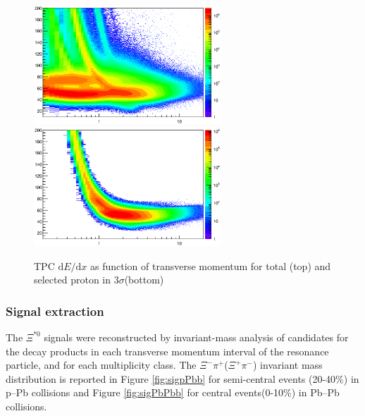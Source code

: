 \begin{figure}[htbp]
\begin{center}
\includegraphics[width=7.0cm]{./Version1/FigChapter5/Selection/PbPbTPCp.eps}
\hspace{0.5cm}
\includegraphics[width=7.0cm]{./Version1/FigChapter5/Selection/PbPbTPCpAfter.eps}
\label{fig:PbPb:TPCp} 
\caption{ TPC $\mathrm{d}E/\mathrm{d}x$ as function of transverse momentum for total (top) and selected proton in 3$\sigma$(bottom) }
\end{center}
\end{figure}



 
\newpage
\subsubsection{Signal extraction}\label{sec:pPb:signal}

The $\Xi^{*0}$ signals were reconstructed by invariant-mass analysis 
of candidates for the decay products in each transverse momentum interval of the resonance 
particle, and for each multiplicity class. The  $\Xi^-\pi^+$($\Xi^+\pi^-$) invariant mass distribution is reported in Figure \ref{fig:sigpPbb} for semi-central events (20-40\%) in p--Pb collisions and Figure \ref{fig:sigPbPbb} for central events(0-10\%) in Pb--Pb collisions.


